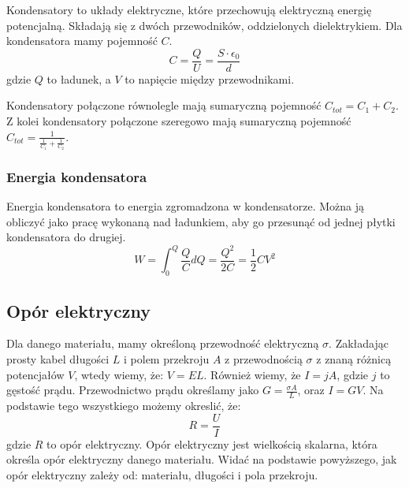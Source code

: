 \documentclass{../notatki}
\begin{document}
Kondensatory to układy elektryczne, które przechowują elektryczną energię
potencjalną. Składają się z dwóch przewodników, oddzielonych dielektrykiem.
Dla kondensatora mamy pojemność $C$.
$$
C = \frac{Q}{U} = \frac{S \cdot \epsilon_0}{d}
$$
gdzie $Q$ to ładunek, a $V$ to napięcie między przewodnikami.
\begin{figure*}[h]
  \centering
\end{figure*}
Kondensatory połączone równolegle mają sumaryczną pojemność $C_{tot}
= C_1 + C_2$. Z kolei kondensatory połączone szeregowo mają sumaryczną pojemność
$C_{tot} = \frac{1}{\frac{1}{C_1} + \frac{1}{C_2}}$.

\subsubsection{Energia kondensatora}

Energia kondensatora to energia zgromadzona w kondensatorze. Można ją
obliczyć jako pracę wykonaną nad ładunkiem, aby go przesunąć od jednej płytki
kondensatora do drugiej.
$$
W = \int_{0}^{Q} \frac{Q}{C} dQ = \frac{Q^2}{2C} = \frac{1}{2} C V^2
$$

\subsection{Opór elektryczny}

Dla danego materiału, mamy określoną przewodność elektryczną $\sigma$.
Zakładając prosty kabel długości $L$ i polem przekroju $A$ z przewodnością
$\sigma$ z znaną różnicą potencjałów $V$, wtedy wiemy, że: $V = EL$. Również
wiemy, że $I = jA$, gdzie $j$ to gęstość prądu. Przewodnictwo prądu określamy
jako $G = \frac{\sigma A}{L}$, oraz $I = GV$. Na podstawie tego wszystkiego
możemy okreslić, że:
$$
R = \frac{U}{I}
$$
gdzie $R$ to opór elektryczny. Opór
elektryczny jest wielkością skalarna, która określa opór elektryczny danego
materiału. Widać na podstawie powyższego, jak opór elektryczny zależy od:
materiału, długości i pola przekroju.
\end{document}
